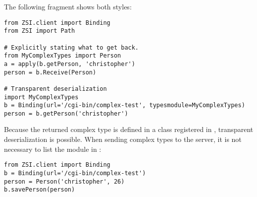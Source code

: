 The following fragment shows both styles:

\begin{verbatim}
from ZSI.client import Binding
from ZSI import Path

# Explicitly stating what to get back.
from MyComplexTypes import Person
a = apply(b.getPerson, 'christopher')
person = b.Receive(Person)

# Transparent deserialization
import MyComplexTypes
b = Binding(url='/cgi-bin/complex-test', typesmodule=MyComplexTypes)
person = b.getPerson('christopher')
\end{verbatim}

Because the returned complex type is defined in a class registered in 
, transparent deserialization is possible.  When sending
complex types to the server, it is not necessary to list the module
in :

\begin{verbatim}
from ZSI.client import Binding
b = Binding(url='/cgi-bin/complex-test')
person = Person('christopher', 26)
b.savePerson(person)
\end{verbatim}
